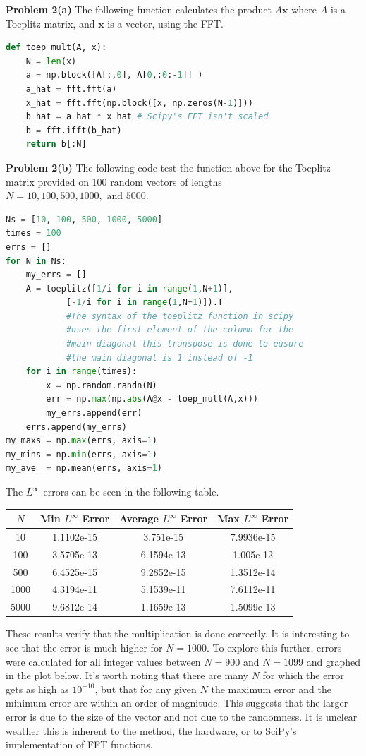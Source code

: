 \documentclass[12pt]{article}
\newcommand{\problem}[1]{\hspace{-4 ex} \large \textbf{Problem #1} }
\renewcommand{\vec}[1]{\boldsymbol{\mathbf{#1}}}
\begin{document}
\bigbreak
\problem{2(a)} The following function calculates the product $A\vec{x}$ where $A$ is a Toeplitz matrix, and $\vec{x}$ is a vector, using the FFT.
\begin{lstlisting}[language=Python]
def toep_mult(A, x):
	N = len(x)
	a = np.block([A[:,0], A[0,:0:-1]] )
	a_hat = fft.fft(a)
	x_hat = fft.fft(np.block([x, np.zeros(N-1)]))
	b_hat = a_hat * x_hat # Scipy's FFT isn't scaled
	b = fft.ifft(b_hat)
	return b[:N]
\end{lstlisting}



\problem{2(b)} The following code test the function above for the Toeplitz matrix provided on 100 random vectors of lengths $N= 10, 100, 500, 1000, \text{ and }5000$. 
\begin{lstlisting}[language=Python]
Ns = [10, 100, 500, 1000, 5000]
times = 100
errs = []
for N in Ns:
	my_errs = []
	A = toeplitz([1/i for i in range(1,N+1)], 
			[-1/i for i in range(1,N+1)]).T
			#The syntax of the toeplitz function in scipy
			#uses the first element of the column for the
			#main diagonal this transpose is done to eusure 
			#the main diagonal is 1 instead of -1
	for i in range(times):
		x = np.random.randn(N)
		err = np.max(np.abs(A@x - toep_mult(A,x)))
		my_errs.append(err)
	errs.append(my_errs)
my_maxs = np.max(errs, axis=1)
my_mins = np.min(errs, axis=1)
my_ave  = np.mean(errs, axis=1)
\end{lstlisting}

The $L^\infty$ errors can be seen in the following table.
\begin{center}
	\begin{tabular}{|c|c|c|c|}
		\hline
		$N$&Min $L^\infty$ Error&Average $L^\infty$ Error&Max $L^\infty$ Error\\ \hline
		10&1.1102e-15&3.751e-15&7.9936e-15\\ \hline
		100&3.5705e-13&6.1594e-13&1.005e-12\\ \hline
		500&6.4525e-15&9.2852e-15&1.3512e-14\\ \hline
		1000&4.3194e-11&5.1539e-11&7.6112e-11\\ \hline
		5000&9.6812e-14&1.1659e-13&1.5099e-13\\ \hline
	\end{tabular}
\end{center}
These results verify that the multiplication is done correctly. It is interesting to see that the error is much higher for $N=1000$. To explore this further, errors were calculated for all integer values between $N=900$ and $N=1099$ and graphed in the plot below. It's worth noting that there are many $N$ for which the error gets as high as $10^{-10}$, but that for any given $N$ the maximum error and the minimum error are within an order of magnitude. This suggests that the larger error is due to the size of the vector and not due to the randomness. It is unclear weather this is inherent to the method, the hardware, or to SciPy's implementation of FFT functions.
\end{document}

